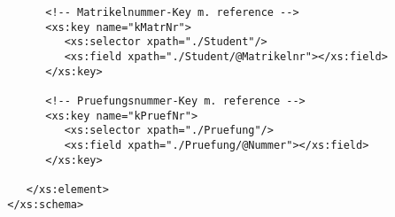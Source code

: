 \begin{verbatim}
		      <!-- Matrikelnummer-Key m. reference -->
		      <xs:key name="kMatrNr">
		         <xs:selector xpath="./Student"/>
		         <xs:field xpath="./Student/@Matrikelnr"></xs:field>
		      </xs:key>
		      
		      <!-- Pruefungsnummer-Key m. reference -->
		      <xs:key name="kPruefNr">
		         <xs:selector xpath="./Pruefung"/>
		         <xs:field xpath="./Pruefung/@Nummer"></xs:field>
		      </xs:key>
		   
		   </xs:element>
		</xs:schema>
	\end{verbatim}